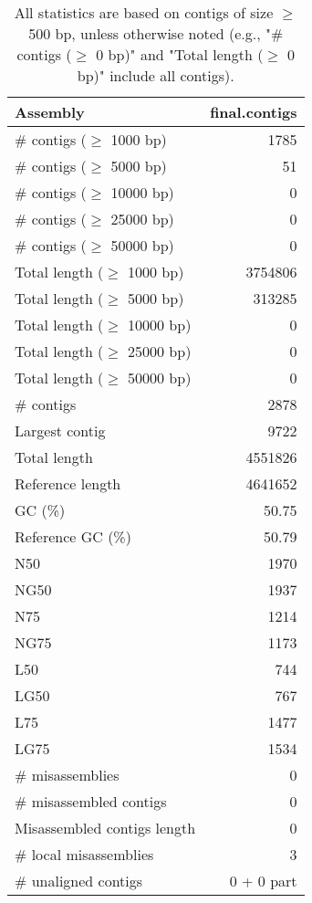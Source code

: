 \documentclass[12pt,a4paper]{article}
\begin{document}
\begin{table}[ht]
\begin{center}
\caption{All statistics are based on contigs of size $\geq$ 500 bp, unless otherwise noted (e.g., "\# contigs ($\geq$ 0 bp)" and "Total length ($\geq$ 0 bp)" include all contigs).}
\begin{tabular}{|l*{1}{|r}|}
\hline
Assembly & final.contigs \\ \hline
\# contigs ($\geq$ 1000 bp) & 1785 \\ \hline
\# contigs ($\geq$ 5000 bp) & 51 \\ \hline
\# contigs ($\geq$ 10000 bp) & 0 \\ \hline
\# contigs ($\geq$ 25000 bp) & 0 \\ \hline
\# contigs ($\geq$ 50000 bp) & 0 \\ \hline
Total length ($\geq$ 1000 bp) & 3754806 \\ \hline
Total length ($\geq$ 5000 bp) & 313285 \\ \hline
Total length ($\geq$ 10000 bp) & 0 \\ \hline
Total length ($\geq$ 25000 bp) & 0 \\ \hline
Total length ($\geq$ 50000 bp) & 0 \\ \hline
\# contigs & 2878 \\ \hline
Largest contig & 9722 \\ \hline
Total length & 4551826 \\ \hline
Reference length & 4641652 \\ \hline
GC (\%) & 50.75 \\ \hline
Reference GC (\%) & 50.79 \\ \hline
N50 & 1970 \\ \hline
NG50 & 1937 \\ \hline
N75 & 1214 \\ \hline
NG75 & 1173 \\ \hline
L50 & 744 \\ \hline
LG50 & 767 \\ \hline
L75 & 1477 \\ \hline
LG75 & 1534 \\ \hline
\# misassemblies & 0 \\ \hline
\# misassembled contigs & 0 \\ \hline
Misassembled contigs length & 0 \\ \hline
\# local misassemblies & 3 \\ \hline
\# unaligned contigs & 0 + 0 part \\ \hline

\end{tabular}
\end{center}
\end{table}
\end{document}

